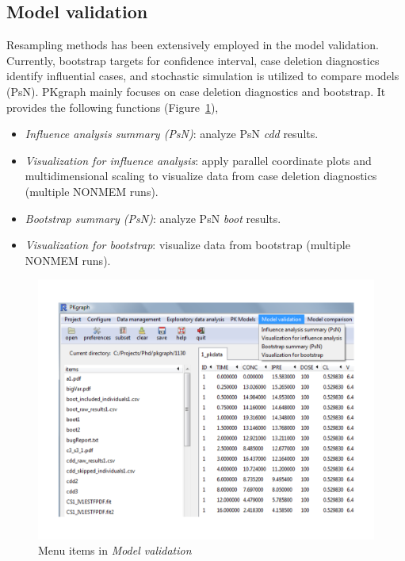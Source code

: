 \documentclass[a4paper]{article}
\begin{document}
\subsection{Model validation}
Resampling methods has been extensively employed in the model validation. Currently, bootstrap targets for confidence interval, case deletion diagnostics identify influential cases, and stochastic simulation is utilized to compare models (PsN).
PKgraph mainly focuses on case deletion diagnostics and bootstrap. It provides the following functions (Figure~\ref{modelv}),
\begin{itemize}
	\item \textit{Influence analysis summary (PsN)}: analyze PsN \textit{cdd} results.
	\item \textit{Visualization for influence analysis}: apply parallel coordinate plots and multidimensional scaling to visualize data from case deletion diagnostics (multiple NONMEM runs).
	\item \textit{Bootstrap summary (PsN)}: analyze PsN \textit{boot} results.
	\item \textit{Visualization for bootstrap}: visualize data from bootstrap (multiple NONMEM runs).
\end{itemize}
\begin{figure}[h!tb] \centering
\includegraphics[scale=0.6]{modelv.pdf}
\caption{Menu items in \textit{Model validation}}
\label{modelv}
\end{figure}
\end{document}
